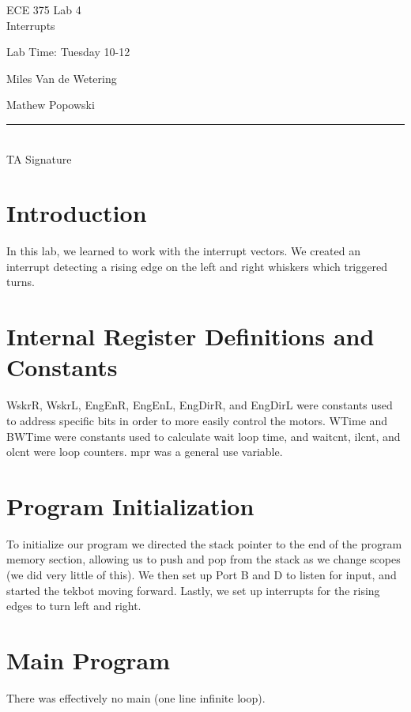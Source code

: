 \documentclass[12pt,letterpaper]{article}
\begin{document}
\begin{titlepage}
    \vspace*{4cm}
    \begin{flushright}
    {\huge
        ECE 375 Lab 4\\[1cm]
    }
    {\large
        Interrupts 
    }
    \end{flushright}
    \begin{flushleft}
    Lab Time: Tuesday 10-12
    \end{flushleft}
    \begin{flushright}
    Miles Van de Wetering

	Mathew Popowski
    \vfill
    \rule{5in}{.5mm}\\
    TA Signature
    \end{flushright}

\end{titlepage}

\section{Introduction}
In this lab, we learned to work with the interrupt vectors. We created an interrupt detecting a rising edge on the left and right whiskers which triggered turns.

\section{Internal Register Definitions and Constants}
WskrR, WskrL, EngEnR, EngEnL, EngDirR, and EngDirL were constants used to address specific bits in order to more easily control the motors. WTime and BWTime were constants used to calculate wait loop time, and waitcnt, ilcnt, and olcnt were loop counters. mpr was a general use variable.

\section{Program Initialization}
To initialize our program we directed the stack pointer to the end of the program memory section, allowing us to push and pop from the stack as we change scopes (we did very little of this). We then set up Port B and D to listen for input, and started the tekbot moving forward. Lastly, we set up interrupts for the rising edges to turn left and right.

\section{Main Program}
There was effectively no main (one line infinite loop).
\end{document}
